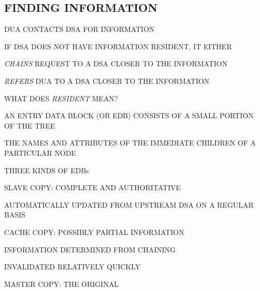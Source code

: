 \begin{bwslide}
\part*	{FINDING INFORMATION}\bf

\begin{nrtc}
\item	DUA CONTACTS DSA FOR INFORMATION

\item	IF DSA DOES NOT HAVE INFORMATION RESIDENT,
	IT EITHER
    \begin{nrtc}
    \item	\emph{CHAINS} REQUEST TO A DSA CLOSER TO THE INFORMATION

    \item	\emph{REFERS} DUA TO A DSA CLOSER TO THE INFORMATION
    \end{nrtc}

\item	WHAT DOES \emph{RESIDENT} MEAN?
\end{nrtc}
\end{bwslide}


\begin{bwslide}

\begin{nrtc}
\item	AN ENTRY DATA BLOCK (OR EDB) CONSISTS OF A SMALL PORTION OF THE TREE
    \begin{nrtc}
    \item	THE NAMES AND ATTRIBUTES OF THE IMMEDIATE CHILDREN OF A
		PARTICULAR NODE
    \end{nrtc}

\item	THREE KINDS OF EDBs
    \begin{nrtc}
    \item	SLAVE COPY: COMPLETE AND AUTHORITATIVE
	\begin{nrtc}
	\item	AUTOMATICALLY UPDATED FROM UPSTREAM DSA ON A REGULAR BASIS
	\end{nrtc}

    \item	CACHE COPY: POSSIBLY PARTIAL INFORMATION
	\begin{nrtc}
	\item	INFORMATION DETERMINED FROM CHAINING

        \item	INVALIDATED RELATIVELY QUICKLY
	\end{nrtc}

    \item	MASTER COPY: THE ORIGINAL
    \end{nrtc}
\end{nrtc}
\end{bwslide}


